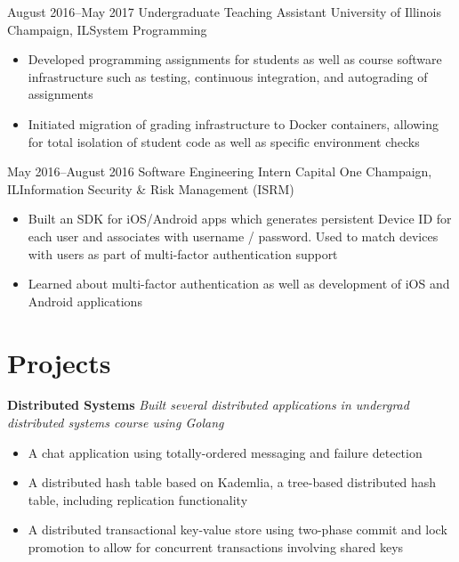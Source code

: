 \documentclass[10pt,a4paper,sans]{moderncv}        %
\begin{document}
\cventry
{August 2016--May 2017}
{\vspace{1pt}Undergraduate Teaching Assistant}
{University of Illinois}
{Champaign, IL}{System Programming}
{
\begin{itemize}
  \item Developed programming assignments for students as well as course software
        infrastructure such as testing, continuous integration, and autograding of
        assignments
  \item Initiated migration of grading infrastructure to Docker containers,
        allowing for total isolation of student code as well as specific environment checks
\end{itemize}}

\vspace{3pt}

\cventry
{May 2016--August 2016}
{\vspace{1pt}Software Engineering Intern}
{Capital One}
{Champaign, IL}{Information Security \& Risk Management (ISRM)}
{\vspace{1pt}
\begin{itemize}
  \item Built an SDK for iOS/Android apps which generates persistent
        Device ID for each user and associates with username / password.
        Used to match devices with users as part of multi-factor authentication support
  \item Learned about multi-factor authentication as well as development of iOS and Android
        applications
\end{itemize}}


\section{Projects}

\vspace{2pt}
\textbf{Distributed Systems}\newline
\textit{Built several distributed applications in undergrad distributed systems course using Golang}
\begin{itemize}
\item A chat application using totally-ordered messaging and failure detection
\item A distributed hash table based on Kademlia, a tree-based distributed hash table, including replication functionality
\item A distributed transactional key-value store using two-phase commit and lock promotion to allow for concurrent transactions involving shared keys
\end{itemize}
\end{document}
